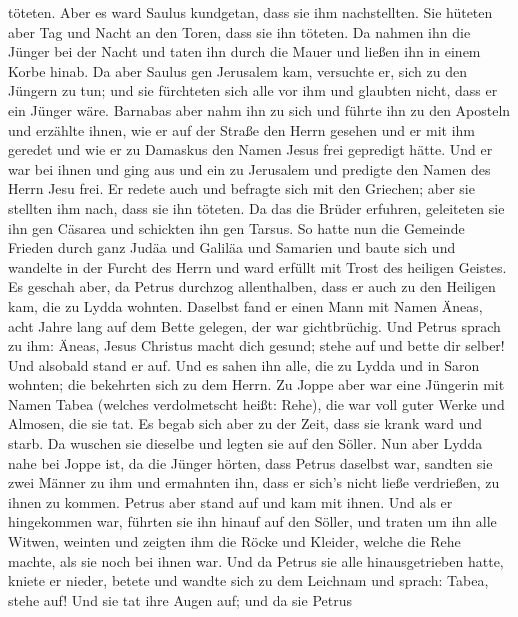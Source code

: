 töteten.  Aber es ward Saulus kundgetan, dass sie ihm
nachstellten. Sie hüteten aber Tag und Nacht an den Toren, dass sie ihn
töteten.  Da nahmen ihn die Jünger bei der Nacht und taten
ihn durch die Mauer und ließen ihn in einem Korbe hinab. 
Da aber Saulus gen Jerusalem kam, versuchte er, sich zu den Jüngern zu
tun; und sie fürchteten sich alle vor ihm und glaubten nicht, dass er
ein Jünger wäre.  Barnabas aber nahm ihn zu sich und führte
ihn zu den Aposteln und erzählte ihnen, wie er auf der Straße den Herrn
gesehen und er mit ihm geredet und wie er zu Damaskus den Namen Jesus
frei gepredigt hätte.  Und er war bei ihnen und ging aus
und ein zu Jerusalem und predigte den Namen des Herrn Jesu frei.
 Er redete auch und befragte sich mit den Griechen; aber
sie stellten ihm nach, dass sie ihn töteten.  Da das die
Brüder erfuhren, geleiteten sie ihn gen Cäsarea und schickten ihn gen
Tarsus.  So hatte nun die Gemeinde Frieden durch ganz Judäa
und Galiläa und Samarien und baute sich und wandelte in der Furcht des
Herrn und ward erfüllt mit Trost des heiligen Geistes.  Es
geschah aber, da Petrus durchzog allenthalben, dass er auch zu den
Heiligen kam, die zu Lydda wohnten.  Daselbst fand er einen
Mann mit Namen Äneas, acht Jahre lang auf dem Bette gelegen, der war
gichtbrüchig.  Und Petrus sprach zu ihm: Äneas, Jesus
Christus macht dich gesund; stehe auf und bette dir selber! Und alsobald
stand er auf.  Und es sahen ihn alle, die zu Lydda und in
Saron wohnten; die bekehrten sich zu dem Herrn.  Zu Joppe
aber war eine Jüngerin mit Namen Tabea (welches verdolmetscht heißt:
Rehe), die war voll guter Werke und Almosen, die sie tat. 
Es begab sich aber zu der Zeit, dass sie krank ward und starb. Da
wuschen sie dieselbe und legten sie auf den Söller.  Nun
aber Lydda nahe bei Joppe ist, da die Jünger hörten, dass Petrus
daselbst war, sandten sie zwei Männer zu ihm und ermahnten ihn, dass er
sich's nicht ließe verdrießen, zu ihnen zu kommen.  Petrus
aber stand auf und kam mit ihnen. Und als er hingekommen war, führten
sie ihn hinauf auf den Söller, und traten um ihn alle Witwen, weinten
und zeigten ihm die Röcke und Kleider, welche die Rehe machte, als sie
noch bei ihnen war.  Und da Petrus sie alle hinausgetrieben
hatte, kniete er nieder, betete und wandte sich zu dem Leichnam und
sprach: Tabea, stehe auf! Und sie tat ihre Augen auf; und da sie Petrus
